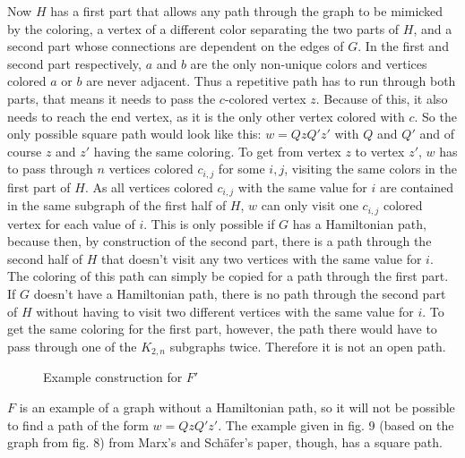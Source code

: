 \documentclass[12pt,a4paper]{article}
\begin{document}
Now $H$ has a first part that allows any path through the graph to be mimicked by the coloring, a vertex of a different color separating the two parts of $H$, and a second part whose connections are dependent on the edges of $G$. In the first and second part respectively, $a$ and $b$ are the only non-unique colors and vertices colored $a$ or $b$ are never adjacent. Thus a repetitive path has to run through both parts, that means it needs to pass the $c$-colored vertex $z$. Because of this, it also needs to reach the end vertex, as it is the only other vertex colored with $c$. So the only possible square path would look like this: $w = QzQ'z'$ with $Q$ and $Q'$ and of course $z$ and $z'$ having the same coloring. To get from vertex $z$ to vertex $z'$, $w$ has to pass through $n$ vertices colored $c_{i,j}$ for some $i,j$, visiting the same colors in the first part of $H$. As all vertices colored $c_{i,j}$ with the same value for $i$ are contained in the same subgraph of the first half of $H$, $w$ can only visit one $c_{i,j}$ colored vertex for each value of $i$. This is only possible if $G$ has a Hamiltonian path, because then, by construction of the second part, there is a path through the second half of $H$ that doesn't visit any two vertices with the same value for $i$. The coloring of this path can simply be copied for a path through the first part. If $G$ doesn't have a Hamiltonian path, there is no path 
through the second part of $H$ without having to visit two different vertices with the same value for $i$. To get the same coloring for the first part, however, the path there would have to pass through one of the $K_{2,n}$ subgraphs twice. Therefore it is not an open path. 
 \begin{figure}[h]
\begin{minipage}[c]{0.3\linewidth}
	
\end{minipage}
\begin{minipage}[t]{0.2\linewidth}
	\caption{$F'$}
\end{minipage}
\begin{minipage}[t]{0.8\linewidth}
	\caption{Example construction for $F'$ \citep{Marx2009}}
\end{minipage}
\end{figure}
\newpage
$F$ is an example of a graph without a Hamiltonian path, so it will not be possible to find a path of the form $w = QzQ'z'$. The example given in fig. 9 (based on the graph from fig. 8) from Marx's and Schäfer's paper, though, has a square path.
\end{document}
